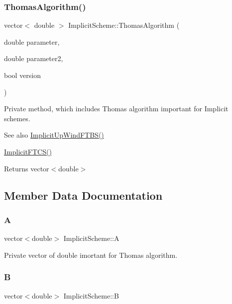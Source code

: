 \subsubsection{\texorpdfstring{Thomas\+Algorithm()}{ThomasAlgorithm()}}
{\footnotesize\ttfamily vector$<$ double $>$ Implicit\+Scheme\+::\+Thomas\+Algorithm (\begin{DoxyParamCaption}\item[{double}]{parameter,  }\item[{double}]{parameter2,  }\item[{bool}]{version }\end{DoxyParamCaption})\hspace{0.3cm}{\ttfamily [private]}}

Private method, which includes Thomas algorithm important for Implicit schemes. \begin{DoxySeeAlso}{See also}
\mbox{\hyperlink{class_implicit_scheme_ab8311a005d69690622e0ddaa0dcff94d}{Implicit\+Up\+Wind\+F\+T\+B\+S()}} 

\mbox{\hyperlink{class_implicit_scheme_afd2b8e73e914a04c326b8cba0d5810ce}{Implicit\+F\+T\+C\+S()}} 
\end{DoxySeeAlso}
\begin{DoxyReturn}{Returns}
vector$<$double$>$ 
\end{DoxyReturn}


\subsection{Member Data Documentation}
\mbox{\label{class_implicit_scheme_a9bd3d0a458683f9a17e8d11016c9f879}} 
\subsubsection{\texorpdfstring{A}{A}}
{\footnotesize\ttfamily vector$<$double$>$ Implicit\+Scheme\+::A\hspace{0.3cm}{\ttfamily [private]}}

Private vector of double imortant for Thomas algorithm. \mbox{\label{class_implicit_scheme_affeedb3fe9f7ebb8be113c884dd09a97}} 
\subsubsection{\texorpdfstring{B}{B}}
{\footnotesize\ttfamily vector$<$double$>$ Implicit\+Scheme\+::B\hspace{0.3cm}{\ttfamily [private]}}

